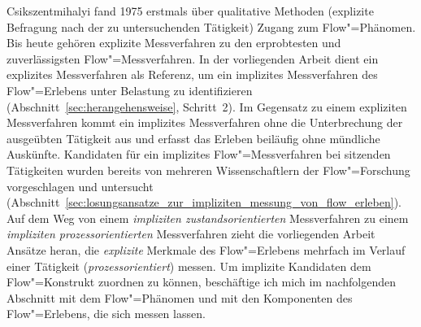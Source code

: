 

Csikszentmihalyi fand 1975 erstmals über qualitative Methoden (explizite Befragung nach der zu untersuchenden Tätigkeit) Zugang zum Flow"=Phänomen. Bis heute gehören explizite Messverfahren zu den erprobtesten und zuverlässigsten Flow"=Messverfahren. In der vorliegenden Arbeit dient ein explizites Messverfahren als Referenz, um ein implizites Messverfahren des Flow"=Erlebens unter Belastung zu identifizieren (Abschnitt~\ref{sec:herangehensweise}, Schritt~2). Im Gegensatz zu einem expliziten Messverfahren kommt ein implizites Messverfahren ohne die Unterbrechung der ausgeübten Tätigkeit aus und erfasst das Erleben beiläufig ohne mündliche Auskünfte. Kandidaten für ein implizites Flow"=Messverfahren bei sitzenden Tätigkeiten wurden bereits von mehreren Wissenschaftlern der Flow"=Forschung vorgeschlagen und untersucht (Abschnitt~\ref{sec:losungsansatze_zur_impliziten_messung_von_flow_erleben}). Auf dem Weg von einem \emph{impliziten zustandsorientierten} Messverfahren zu einem \emph{impliziten prozessorientierten} Messverfahren zieht die vorliegenden Arbeit Ansätze heran, die \emph{explizite} Merkmale des Flow"=Erlebens mehrfach im Verlauf einer Tätigkeit (\emph{prozessorientiert}) messen. Um implizite Kandidaten dem Flow"=Konstrukt zuordnen zu können, beschäftige ich mich im nachfolgenden Abschnitt mit dem Flow"=Phänomen und mit den Komponenten des Flow"=Erlebens, die sich messen lassen. 
